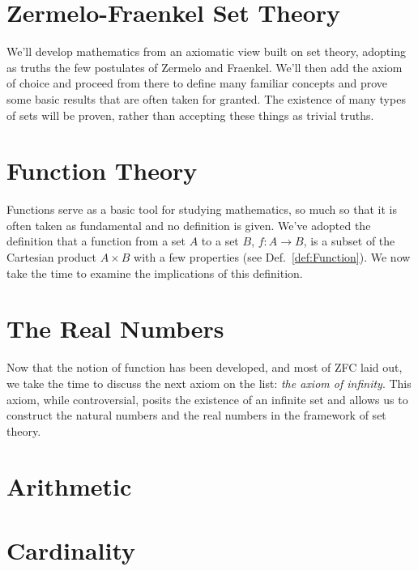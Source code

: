 \begingroup
    \ifcsname\PATH\endcsname
        \newcommand{\PATH}{books/Foundations/ZFC}
        \newcommand{\OLDPATH}{\PATH}
    \else
        \newcommand{\OLDPATH}{\PATH}
        \renewcommand{\PATH}{books/Foundations/ZFC}
    \fi
    \chapter{Zermelo-Fraenkel Set Theory}
        \label{chapt:Zermelo_Fraenkel_Set_Theory}%
        We'll develop mathematics from an axiomatic view built on set theory,
        adopting as truths the few postulates of Zermelo and Fraenkel. We'll
        then add the axiom of choice and proceed from there to define many
        familiar concepts and prove some basic results that are often taken for
        granted. The existence of many types of sets will be proven, rather than
        accepting these things as trivial truths.
        
        
        
    \chapter{Function Theory}
        \label{chapt:Function_Theory}%
        Functions serve as a basic tool for studying mathematics, so much so
        that it is often taken as fundamental and no definition is given. We've
        adopted the definition that a function from a set $A$ to
        a set $B$, $f:A\rightarrow{B}$, is a subset of the Cartesian product
        $A\times{B}$ with a few properties (see Def.~\ref{def:Function}). We now
        take the time to examine the implications of this definition.
        
        
        
        
    \chapter{The Real Numbers}
        Now that the notion of function has been developed, and most of ZFC laid
        out, we take the time to discuss the next axiom on the list:
        \textit{the axiom of infinity}. This axiom,
        while controversial, posits the existence of an infinite set and allows
        us to construct the natural numbers and the real numbers in the
        framework of set theory.
    \chapter{Arithmetic}
        
        
    \chapter{Cardinality}
        
    \renewcommand{\PATH}{\OLDPATH}
\endgroup